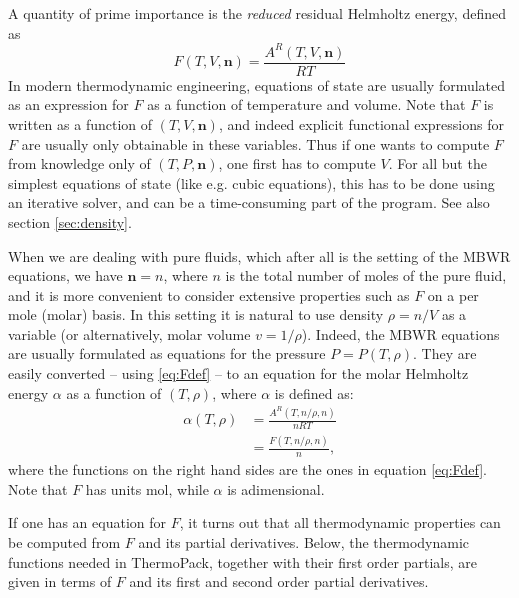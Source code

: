\documentclass[english]{../thermomemo/thermomemo}
\newcommand{\mbn}[0]{\mathbf n}
\numberwithin{equation}{section}
\begin{document}
A quantity of prime importance is the \textit{reduced} residual
Helmholtz energy, defined as
\begin{equation}
  \label{eq:Fdef}
  F(T,V,\mbn) = \frac{A^R(T,V,\mbn)}{RT}
\end{equation}
In modern thermodynamic engineering, equations of state are usually
formulated as an expression for $F$ as a function of temperature and
volume. Note that $F$ is written as a function of $(T,V,\mbn)$, and
indeed explicit functional expressions for $F$ are usually only
obtainable in these variables. Thus if one wants to compute $F$ from
knowledge only of $(T,P,\mbn)$, one first has to compute $V$. For all
but the simplest equations of state (like e.g. cubic equations), this has
to be done using an iterative solver, and can be a time-consuming part
of the program. See also section \ref{sec:density}.

When we are dealing with pure fluids, which after all is the setting
of the MBWR equations, we have $\mbn = n$, where $n$ is the total
number of moles of the pure fluid, and it is more convenient to
consider extensive properties such as $F$ on a per mole (molar)
basis. In this setting it is natural to use density $\rho = n/V$ as a
variable (or alternatively, molar volume $v = 1/\rho$). Indeed, the MBWR
equations are usually formulated as equations for the pressure $P =
P(T,\rho)$. They are easily converted -- using \eqref{eq:Fdef} -- to
an equation for the molar Helmholtz energy $\alpha$ as a function of
$(T,\rho)$, where $\alpha$ is defined as:
\begin{align}
  \alpha(T,\rho) &= \frac{A^R(T,n/\rho,n)}{nRT} \\
  &= \frac{F(T,n/\rho,n)}{n},
\end{align}
where the functions on the right hand sides are the ones in equation
\eqref{eq:Fdef}. Note that $F$ has units $\mathrm{mol}$, while
$\alpha$ is adimensional.

If one has an equation for $F$, it turns out that all thermodynamic
properties can be computed from $F$ and its partial
derivatives. Below, the thermodynamic functions needed in ThermoPack, together with their first
order partials, are given in terms of $F$ and its first and second
order partial derivatives.
\end{document}
